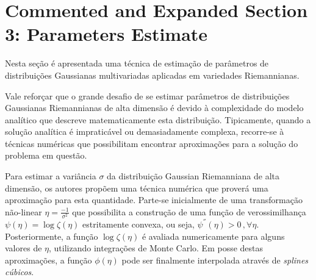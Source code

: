 \documentclass[a4paper,titlepage]{article}
\begin{document}
\section{Commented and Expanded Section 3: Parameters Estimate}
Nesta seção é apresentada uma técnica de estimação de parâmetros de
distribuições Gaussianas multivariadas aplicadas em variedades Riemannianas.

\begin{center}
  \vspace{1em}
  \vspace{1em}
\end{center}

Vale reforçar que o grande desafio de se estimar parâmetros de distribuições
Gaussianas Riemannianas de alta dimensão é devido à complexidade do modelo
analítico que descreve matematicamente esta distribuição. Tipicamente, quando
a solução analítica é impraticável ou demasiadamente complexa, recorre-se à
técnicas numéricas que possibilitam encontrar aproximações para a solução do
problema em questão.

Para estimar a variância $\sigma$ da distribuição Gaussian Riemanniana de alta
dimensão, os autores propõem uma técnica numérica que proverá uma aproximação
para esta quantidade. Parte-se inicialmente de uma transformação não-linear
$\eta = \frac{-1}{\sigma^2}$ que possibilita a construção de uma função de
verossimilhança $\psi(\eta) = \log \zeta(\eta)$ estritamente convexa, ou seja,
$\psi^{''}(\eta) > 0\,, \forall \eta$. Posteriormente, a função
$\log \zeta(\eta)$ é avaliada numericamente para alguns valores de $\eta$,
utilizando integrações de Monte Carlo. Em posse destas aproximações, a função
$\phi(\eta)$ pode ser finalmente interpolada através de \textit{splines cúbicos}. 
\end{document}
